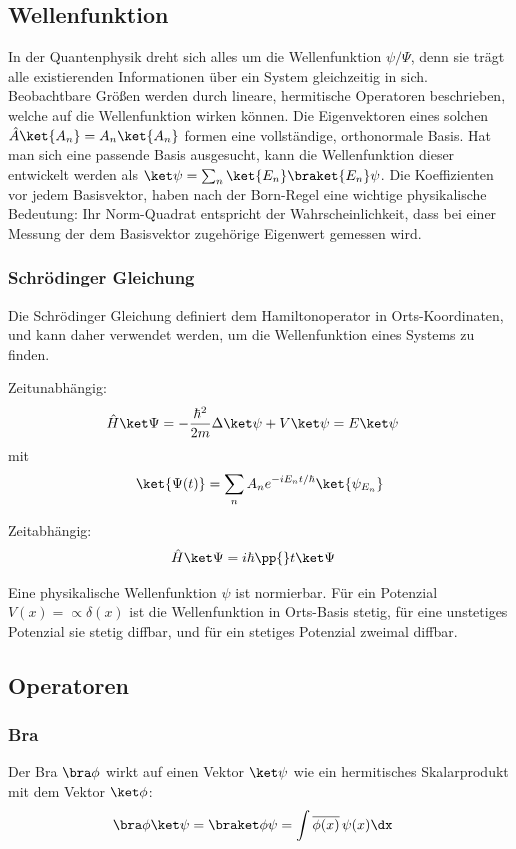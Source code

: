 \documentclass[twocolumn, unnumberedsubsub]{summery_5.0} %
\begin{document}
\subsection{Wellenfunktion}
In der Quantenphysik dreht sich alles um die Wellenfunktion \(\psi/\Psi\), denn sie trägt alle existierenden Informationen 
über ein System gleichzeitig in sich.  
Beobachtbare Größen werden durch lineare, hermitische Operatoren beschrieben, welche auf die Wellenfunktion
wirken können.
Die Eigenvektoren eines solchen  \(\hat A \ket {A_n} = A_n\ket{A_n} \) formen eine 
vollständige, orthonormale Basis. Hat man sich eine passende Basis ausgesucht, 
kann die Wellenfunktion dieser entwickelt werden als 
\(\ket \psi = \sum_n \ket{E_n} \braket{E_n}\psi \).
Die Koeffizienten vor jedem Basisvektor, haben nach der Born-Regel eine wichtige physikalische Bedeutung:
Ihr Norm-Quadrat entspricht der Wahrscheinlichkeit, dass bei einer Messung der dem Basisvektor 
zugehörige Eigenwert gemessen wird.

\subsubsection{Schrödinger Gleichung}
Die Schrödinger Gleichung definiert dem Hamiltonoperator in Orts-Koordinaten, und kann daher verwendet werden,
um die Wellenfunktion eines Systems zu finden.

Zeitunabhängig:
\begin{align*}
        \hat H\ket \Psi&= 
        -\frac{\hbar ^2}{2m} \Delta \ket\psi + V \ket\psi
        =E\ket\psi
\end{align*}
mit \begin{align*}
    \ket{\Psi(t)} = \sum_{n} A_n e^{ {-iE_n t}/\hbar} \ket{\psi_{E_n}}
\end{align*}

Zeitabhängig:
\begin{align*}
    \hat H\ket \Psi &= i\hbar \pp{}t\ket\Psi
\end{align*}

Eine physikalische Wellenfunktion \(\psi\) ist normierbar. Für ein Potenzial \(V(x)=\propto \delta(x)\)
ist die Wellenfunktion in Orts-Basis stetig, für eine unstetiges Potenzial sie stetig diffbar, und 
für ein stetiges Potenzial zweimal diffbar.

\subsection{Operatoren}
\subsubsection{Bra}
Der Bra \(\bra \phi\) wirkt auf einen Vektor \(\ket\psi\) wie ein hermitisches Skalarprodukt
mit dem Vektor \(\ket \phi\):
\begin{align*}
    \bra \phi\ket \psi &= \braket \phi\psi = \int \overline{\phi(x)}\,\psi(x)\dx
\end{align*}
\end{document}
